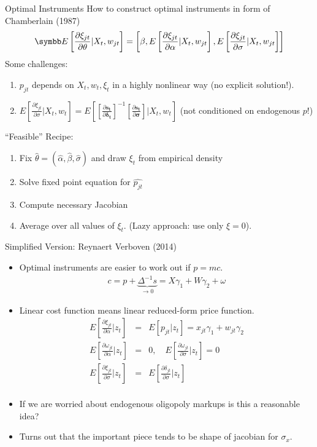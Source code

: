 \documentclass[aspectratio=169,11pt]{beamer}
\begin{document}
\begin{frame}{Optimal Instruments}
How to construct optimal instruments in form of Chamberlain (1987)
\begin{eqnarray*}
\E\left[\frac{\partial \xi_{jt}}{\partial \theta} | X_t, w_{jt} \right] = \left[\beta, E\left[\frac{\partial \xi_{jt}}{\partial \alpha} | X_t, w_{jt} \right] , E\left[\frac{\partial \xi_{jt}}{\partial \sigma} | X_t, w_{jt} \right] \right]
\end{eqnarray*}
Some challenges:
\begin{enumerate}
\item $p_{jt}$ depends on $X_{t}, w_{t}, \xi_{t}$ in a highly nonlinear way (no explicit solution!).
\item $E[\frac{\partial \xi_{jt}}{\partial \sigma} | X_t, w_{t} ] =E[[\frac{\partial \symbf{s_t}}{\partial \symbf{\delta_t}}]^{-1} [\frac{\partial \symbf{s_t}}{\partial \symbf{\sigma}}] | X_t, w_{t} ]$  (not conditioned on endogenous $p$!)
\end{enumerate}
``Feasible'' Recipe:
\begin{enumerate}
\item Fix $\hat{\theta}=(\hat{\alpha},\hat{\beta},\hat{\sigma})$ and draw $\xi_t$ from empirical density
\item Solve fixed point equation for $\hat{p_{jt}}$
\item Compute necessary Jacobian
\item Average over all values of $\xi_t$. (Lazy approach: use only $\xi =0$).
\end{enumerate}
\end{frame}


\begin{frame}{Simplified Version: Reynaert Verboven (2014)}
\begin{itemize}
\footnotesize
\item Optimal instruments are easier to work out if $p = mc$.
\begin{eqnarray*}
c = p  + \underbrace{\Delta^{-1} s}_{\rightarrow 0}  = X \gamma_1 + W \gamma_2 + \omega
\end{eqnarray*}
\item Linear cost function means linear reduced-form price function.
\begin{eqnarray*}
E\left[ \frac{\partial \xi_{jt} }{\partial \alpha} | z_t \right] &=& E[p_{jt} | z_t] = x_{jt} \gamma_1 + w_{jt} \gamma_2\\
E\left[ \frac{\partial \omega_{jt} }{\partial \alpha} | z_t \right] &=& 0 , \quad E\left[ \frac{\partial \omega_{jt} }{\partial \sigma} | z_t \right] = 0\\
E\left[ \frac{\partial \xi_{jt} }{\partial \sigma} | z_t \right] &=&E\left[ \frac{\partial \delta_{jt} }{\partial \sigma} | z_t \right]\\
\end{eqnarray*}
\item If we are worried about endogenous oligopoly markups is this a reasonable idea?
\item Turns out that the important piece tends to be \alert{shape} of jacobian for $\sigma_x$.
\end{itemize}
\end{frame}
\end{document}
